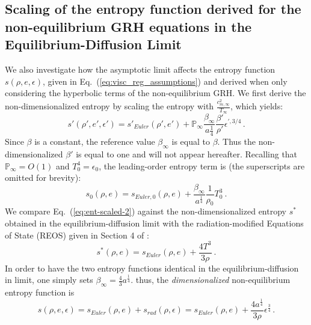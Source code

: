 \documentclass[review]{elsarticle}
\newcommand{\eqt}[1]{Eq.~(\ref{#1})}                     %
\newcommand{\app}[1]{Appendix~\ref{#1}}                     %
\renewcommand{\Re}{\textrm{Re}}
\renewcommand{\Re}{\mathbb{P}_\infty}
\newcommand{\tcr}[1]{\textcolor{red}{#1}}
\newcommand{\tcb}[1]{\textcolor{blue}{#1}}
\begin{document}
\subsection{Scaling of the entropy function derived for the non-equilibrium GRH equations in the Equilibrium-Diffusion Limit}\label{sect:ent-asym-limit}
%
We also investigate how the asymptotic limit affects the entropy function $s(\rho, e, \epsilon)$, given in \eqt{eq:visc_reg_assumptions} and derived when only considering the hyperbolic terms of the non-equilibrium GRH. We first derive the non-dimensionalized entropy by scaling the entropy with $\frac{c_{m,\infty}^2}{T_\infty}$, which yields:
%
\begin{equation}\label{eq:ent-scaled}
s' \left( \rho', e', \epsilon' \right) = s'_{Euler} \left( \rho', e' \right)+ \Re \frac{\beta_\infty}{a\frac{1}{4}} \frac{\beta'}{\rho'} \epsilon^{\prime,3/4} \,.
\end{equation}
%
Since $\beta$ is a constant, the reference value $\beta_\infty$ is equal to $\beta$. Thus the non-dimensionalized $\beta'$ is equal to one and will not appear hereafter.
Recalling that $\Re = O(1)$ and $T_0^4 = \epsilon_0$, the leading-order entropy term is (the superscripts are omitted for brevity):
%
\begin{equation}\label{eq:ent-scaled-2}
s_0 \left( \rho, e \right) = s_{Euler,0}\left( \rho, e \right) + \frac{\beta_\infty}{a^\frac{1}{4}} \frac{1}{\rho_0} T_0^3 \ .
\end{equation}
%
We compare \eqt{eq:ent-scaled-2} against the non-dimensionalized entropy $s^*$ obtained in the equilibrium-diffusion limit with the radiation-modified Equations of State (REOS) given in Section 4 of \cite{LowrieMorel}:
%
\begin{equation}\label{eq:ent-reos}
s^*(\rho,e) = s_{Euler}(\rho,e) + \frac{4T^3}{3\rho} \ .
\end{equation}
%
In order to have the two entropy functions identical in the equilibrium-diffusion in limit, one simply sets $\beta_\infty = \frac{4}{3} a^\frac{1}{4}$. thus, the \emph{dimensionalized} non-equilibrium entropy function is 
%
\begin{equation}\label{eq:entropy}
s \left( \rho, e, \epsilon \right) = s_{Euler}\left( \rho, e \right) + s_{rad}(\rho,\epsilon)= s_{Euler}\left( \rho, e \right) + \frac{4a^\frac{1}{4}}{3\rho} \epsilon^\frac{3}{4} \,.
\end{equation}
\end{document}
